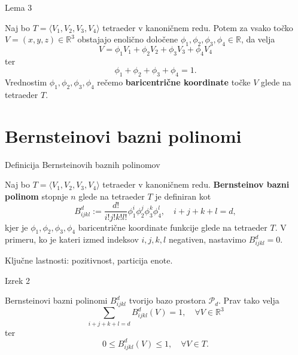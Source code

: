\documentclass{beamer}
\begin{document}
\begin{frame}{Lema 3}
\begin{lemma}\label{lema_baricentricne}
    Naj bo $T = \langle V_1, V_2, V_3, V_4 \rangle$ tetraeder v kanoničnem redu.
    Potem za vsako točko $V = (x,y,z) \in \mathbb{R}^3$ obstajajo enolično določene
     $\phi_1, \phi_2, \phi_3, \phi_4 \in \mathbb{R}$,
    da velja 
    \begin{equation}\label{eq_baricentricne}
        V = \phi_1 V_1 + \phi_2 V_2 + \phi_3 V_3 + \phi_4 V_4
    \end{equation} ter 
    \begin{equation}\label{eq_particija}
        \phi_1 + \phi_2 + \phi_3 + \phi_4 = 1 .
    \end{equation}
    Vrednostim $\phi_1, \phi_2, \phi_3, \phi_4$ rečemo \textbf{baricentrične 
    koordinate} točke $V$ glede na tetraeder $T$.
\end{lemma}
\end{frame}




\section{Bernsteinovi bazni polinomi}
\begin{frame}{Definicija Bernsteinovih baznih polinomov}
\begin{definition}
    Naj bo $T = \langle V_1, V_2, V_3, V_4 \rangle$ tetraeder v kanoničnem redu.
    \textbf{Bernsteinov bazni polinom} stopnje $n$ glede na tetraeder $T$ je definiran kot
    \begin{equation}
        B_{ijkl}^d := \frac{d!}{i!j!k!l!} \phi_1^i \phi_2^j \phi_3^k \phi_4^l, \quad i + j + k + l = d,
    \end{equation}
    kjer je $\phi_1, \phi_2, \phi_3, \phi_4$ baricentrične koordinate funkcije
    glede na tetraeder $T$. V primeru, ko je kateri izmed indeksov $i, j, k, l$ negativen, 
    nastavimo $B_{ijkl}^d = 0$.
\end{definition}
    Ključne lastnosti: pozitivnost, particija enote.
\end{frame}

\begin{frame}{Izrek 2}
\begin{theorem}\label{izrek_bernstein}
    Bernsteinovi bazni polinomi $B_{ijkl}^d$ tvorijo bazo prostora $\mathcal{P}_d$.
    Prav tako velja 
    \begin{equation}\label{eq_partcija_enote}
        \sum_{i+j+k+l = d} B_{ijkl}^d(V) = 1, \quad \forall V \in \mathbb{R}^3     
    \end{equation}
    ter
    \begin{equation}
        0 \leq B_{ijkl}^d(V) \leq 1, \quad \forall V \in T.
    \end{equation}
\end{theorem}
\end{frame}
\end{document}
